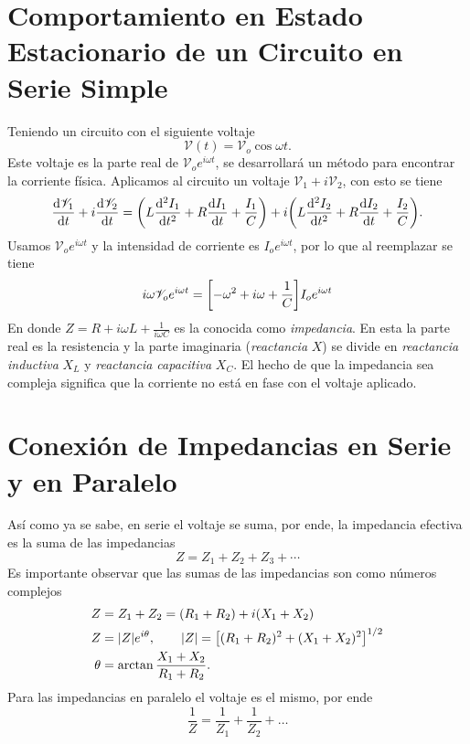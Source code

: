 \section{Comportamiento en Estado Estacionario de un Circuito en Serie Simple}
Teniendo un circuito con el siguiente voltaje
\begin{equation}
    \mathscr{V} (t) = \mathscr{V}_o \cos{\omega t}.
\end{equation}
Este voltaje es la parte real de $\mathscr{V}_o e^{i\omega t}$, se desarrollará un método para encontrar la corriente física. Aplicamos al circuito un voltaje $\mathscr{V}_1 + i\mathscr{V}_2$, con esto se tiene
\begin{equation}
    \dv{\mathscr{V}_1}{t} + i\dv{\mathscr{V}_2}{t} = \qty(L\dv[2]{I_1}{t} + R\dv{I_1}{t} + \frac{I_1}{C}) + i\qty(L\dv[2]{I_2}{t} + R\dv{I_2}{t} + \frac{I_2}{C}).
\end{equation}
Usamos $\mathscr{V}_o e^{i\omega t}$ y la intensidad de corriente es $I_o e^{i\omega t}$, por lo que al reemplazar se tiene
\begin{equation}
    i\omega \mathscr{V}_o e^{i\omega t} = \qty[-\omega ^2 + i\omega + \frac{1}{C}] I_o e^{i\omega t}
\end{equation}
En donde $Z = R + i\omega L + \frac{1}{i\omega C}$ es la conocida como \textit{impedancia}. En esta la parte real es la resistencia  y la parte imaginaria (\textit{reactancia} $X$) se divide en \textit{reactancia inductiva} $X_L$ y \textit{reactancia capacitiva} $X_C$. El hecho de que la impedancia sea compleja significa que la corriente no está en fase con el voltaje aplicado.

\section{Conexión de Impedancias en Serie y en Paralelo}
Así como ya se sabe, en serie el voltaje se suma, por ende, la impedancia efectiva es la suma de las impedancias
\begin{equation}
    Z = Z_1 + Z_2 + Z_3 + \cdots
\end{equation}
Es importante observar que las sumas de las impedancias son como números complejos
\begin{align*}
    Z &= Z_1 + Z_2 = (R_1 + R_2) + i(X_1 + X_2) \\
    Z &= \abs{Z} e^{i\theta}, \qquad \abs{Z} = \qty[(R_1 + R_2)^2 + (X_1 + X_2)^2]^{1/2} \\
    \theta &= \arctan{\frac{X_1 + X_2}{R_1 + R_2}}.
\end{align*}
Para las impedancias en paralelo el voltaje es el mismo, por ende
\begin{equation}
    \frac{1}{Z} = \frac{1}{Z_1} + \frac{1}{Z_2} + \dots
\end{equation}


